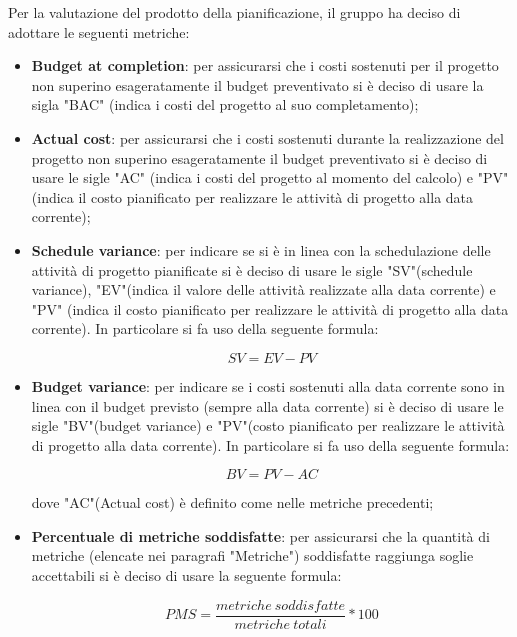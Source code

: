 Per la valutazione del prodotto della pianificazione, il gruppo ha deciso di adottare le seguenti metriche:
\begin{itemize}
\item \textbf{Budget at completion}: per assicurarsi che i costi sostenuti per il progetto non superino esageratamente il budget preventivato si è deciso di usare la sigla "BAC" (indica i costi del progetto al suo completamento);
\item \textbf{Actual cost}: per assicurarsi che i costi sostenuti durante la realizzazione del progetto non superino esageratamente il budget preventivato si è deciso di usare le sigle "AC" (indica i costi del progetto al momento del calcolo) e "PV" (indica il costo pianificato per realizzare le attività di progetto alla data corrente);
\item \textbf{Schedule variance}: per indicare se si è in linea con la schedulazione delle attività di progetto pianificate si è deciso di usare le sigle "SV"(schedule variance), "EV"(indica il valore delle attività realizzate alla data corrente) e "PV" (indica il costo pianificato per realizzare le attività di progetto alla data corrente). In particolare si fa uso della seguente formula: \vspace{-0.5cm}
\begin{center}
\[SV=EV-PV\]
\end{center}
\item \textbf{Budget variance}: per indicare se i costi sostenuti alla data corrente sono in linea con il budget previsto (sempre alla data corrente) si è deciso di usare le sigle "BV"(budget variance) e "PV"(costo pianificato per realizzare le attività di progetto alla data corrente).  In particolare si fa uso della seguente formula: \vspace{-0.5cm}
\begin{center}
\[BV=PV-AC\]
\end{center}
dove "AC"(Actual cost) è definito come nelle metriche precedenti;
\item \textbf{Percentuale di metriche soddisfatte}: per assicurarsi che la quantità di metriche (elencate nei paragrafi "Metriche") soddisfatte raggiunga soglie accettabili si è deciso di usare la seguente formula:
\begin{center}
\[PMS=\frac{metriche \ soddisfatte}{metriche \ totali}*100\]
\end{center}
\end{itemize}


